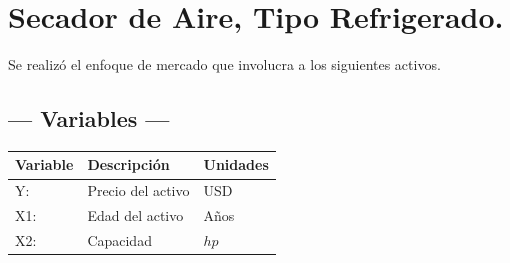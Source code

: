 
\section{Secador de Aire, Tipo Refrigerado.} %
Se realizó el enfoque de mercado que involucra a los siguientes activos.

\subsection{\centering --- Variables ---} %
\begin{center}
  \begin{tabular}{|l|l|l|}
    \hline 
    Variable & Descripción   & Unidades\\ \hline 
    Y:  & Precio del activo  & USD \\ \hline 
    X1: & Edad del activo    & Años \\ \hline 
		X2: & Capacidad & \(hp\) \\ \hline 
  \end{tabular}
\end{center} 

